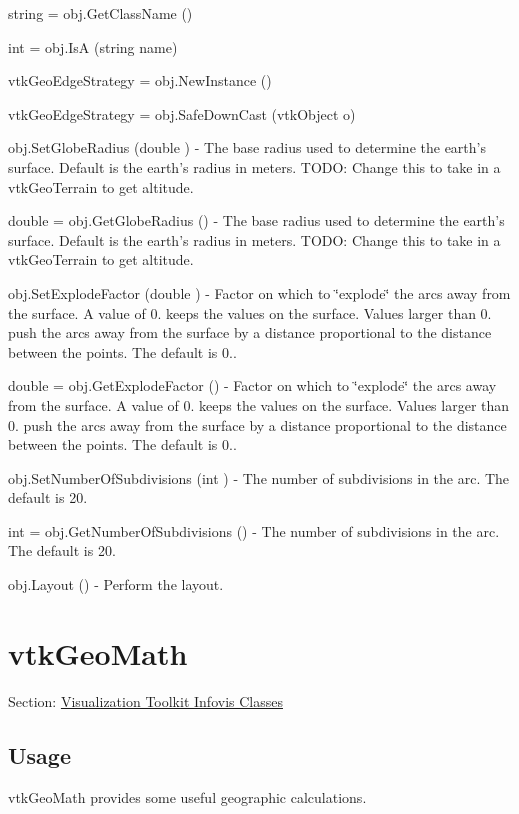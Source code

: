 \begin{DoxyItemize}
\item {\ttfamily string = obj.\-Get\-Class\-Name ()}  
\item {\ttfamily int = obj.\-Is\-A (string name)}  
\item {\ttfamily vtk\-Geo\-Edge\-Strategy = obj.\-New\-Instance ()}  
\item {\ttfamily vtk\-Geo\-Edge\-Strategy = obj.\-Safe\-Down\-Cast (vtk\-Object o)}  
\item {\ttfamily obj.\-Set\-Globe\-Radius (double )} -\/ The base radius used to determine the earth's surface. Default is the earth's radius in meters. T\-O\-D\-O\-: Change this to take in a vtk\-Geo\-Terrain to get altitude.  
\item {\ttfamily double = obj.\-Get\-Globe\-Radius ()} -\/ The base radius used to determine the earth's surface. Default is the earth's radius in meters. T\-O\-D\-O\-: Change this to take in a vtk\-Geo\-Terrain to get altitude.  
\item {\ttfamily obj.\-Set\-Explode\-Factor (double )} -\/ Factor on which to \char`\"{}explode\char`\"{} the arcs away from the surface. A value of 0. keeps the values on the surface. Values larger than 0. push the arcs away from the surface by a distance proportional to the distance between the points. The default is 0..  
\item {\ttfamily double = obj.\-Get\-Explode\-Factor ()} -\/ Factor on which to \char`\"{}explode\char`\"{} the arcs away from the surface. A value of 0. keeps the values on the surface. Values larger than 0. push the arcs away from the surface by a distance proportional to the distance between the points. The default is 0..  
\item {\ttfamily obj.\-Set\-Number\-Of\-Subdivisions (int )} -\/ The number of subdivisions in the arc. The default is 20.  
\item {\ttfamily int = obj.\-Get\-Number\-Of\-Subdivisions ()} -\/ The number of subdivisions in the arc. The default is 20.  
\item {\ttfamily obj.\-Layout ()} -\/ Perform the layout.  
\end{DoxyItemize}\hypertarget{vtkinfovis_vtkgeomath}{}\section{vtk\-Geo\-Math}\label{vtkinfovis_vtkgeomath}
Section\-: \hyperlink{sec_vtkinfovis}{Visualization Toolkit Infovis Classes} \hypertarget{vtkwidgets_vtkxyplotwidget_Usage}{}\subsection{Usage}\label{vtkwidgets_vtkxyplotwidget_Usage}
vtk\-Geo\-Math provides some useful geographic calculations.

